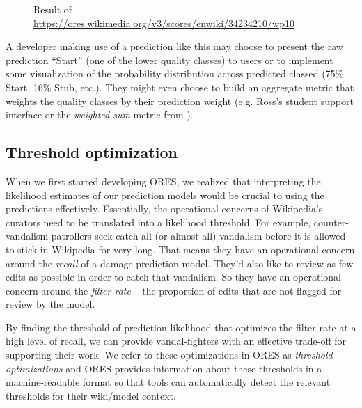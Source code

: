 \begin{figure}[htbp]
        \caption{Result of \url{https://ores.wikimedia.org/v3/scores/enwiki/34234210/wp10}}
        \label{fig:english_damaging_model_info}
\end{figure}

A developer making use of a prediction like this may choose to present the raw prediction ``Start'' (one of the lower quality classes) to users or to implement some visualization of the probability distribution across predicted classed (75\% Start, 16\% Stub, etc.).  They might even choose to build an aggregate metric that weights the quality classes by their prediction weight (e.g. Ross's student support interface\cite{ross2016visualizing} or the \emph{weighted sum} metric from \cite{halfaker2017interpolating}).

\subsection{Threshold optimization}
When we first started developing ORES, we realized that interpreting the likelihood estimates of our prediction models would be crucial to using the predictions effectively.  Essentially, the operational concerns of Wikipedia's curators need to be translated into a likelihood threshold.  For example, counter-vandalism patrollers seek catch all (or almost all) vandalism before it is allowed to stick in Wikipedia for very long.  That means they have an operational concern around the \emph{recall} of a damage prediction model.  They'd also like to review as few edits as possible in order to catch that vandalism.  So they have an operational concern around the \emph{filter rate} -- the proportion of edits that are not flagged for review by the model\cite{halfaker2016notes}.

By finding the threshold of prediction likelihood that optimizes the filter-rate at a high level of recall, we can provide vandal-fighters with an effective trade-off for supporting their work.  We refer to these optimizations in ORES as \emph{threshold optimizations} and ORES provides information about these thresholds in a machine-readable format so that tools can automatically detect the relevant thresholds for their wiki/model context.


